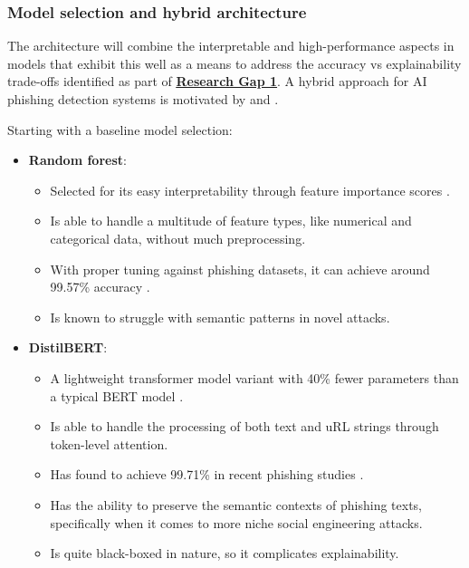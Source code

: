 
\subsubsection*{Model selection and hybrid architecture}
The architecture will combine the interpretable and high-performance aspects in models that exhibit this well as a means to address the accuracy vs explainability trade-offs identified as part of \hyperref[research-gap-1]{\uline{\textbf{Research Gap 1}}}. A hybrid approach for AI phishing detection systems is motivated by \cite{do2024integrated} and \cite{alzahrani2024explainable}.\newline

\noindent Starting with a baseline model selection:

\begin{itemize}
  \item \textbf{Random forest}:
  \begin{itemize}
    \item Selected for its easy interpretability through feature importance scores \citep{gupta2021novel}.
    \item Is able to handle a multitude of feature types, like numerical and categorical data, without much preprocessing.
    \item With proper tuning against phishing datasets, it can achieve around 99.57\% accuracy \citep{kapoor2024comparative}.
    \item Is known to struggle with semantic patterns in novel attacks.
  \end{itemize}
  \item \textbf{DistilBERT}:
  \begin{itemize}
    \item A lightweight transformer model variant with 40\% fewer parameters than a typical BERT model \citep{sanchez2022phishing}.
    \item Is able to handle the processing of both text and uRL strings through token-level attention.
    \item Has found to achieve 99.71\% in recent phishing studies \citep{do2024integrated}.
    \item Has the ability to preserve the semantic contexts of phishing texts, specifically when it comes to more niche social engineering attacks.
    \item Is quite black-boxed in nature, so it complicates explainability.
  \end{itemize}
\end{itemize}

